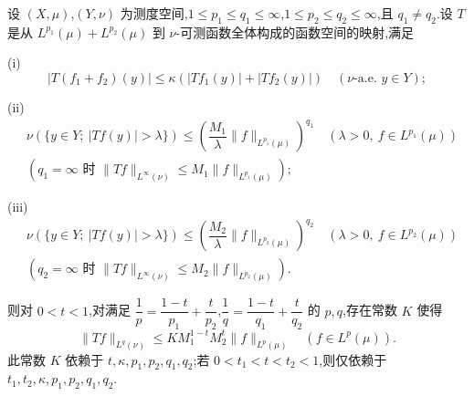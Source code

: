 \begin{theorem}\label{thm:1.8.6}
设 $(X, \mu)$,$(Y, \nu)$ 为测度空间,$1 \leq p_{1} \leq q_{1} \leq \infty$,$1 \leq p_{2} \leq q_{2} \leq \infty$,且 $q_{1} \neq q_{2}$.设 $T$ 是从 $L^{p_{1}}(\mu) + L^{p_{2}}(\mu)$ 到 $\nu$-可测函数全体构成的函数空间的映射,满足

(i)
\begin{equation*}
|T(f_{1} + f_{2})(y)| \leq \kappa\left(|Tf_{1}(y)| + |Tf_{2}(y)|\right) \quad (\nu\text{-a.e. } y \in Y);
\end{equation*}

(ii)
\begin{align*}
& \nu(\{y \in Y;\ |Tf(y)| > \lambda\}) \leq \left(\dfrac{M_{1}}{\lambda}\| f \|_{L^{p_{1}}(\mu)}\right)^{q_{1}} \quad (\lambda > 0,\ f \in L^{p_{1}}(\mu)) \\[4pt]
& \left(q_{1} = \infty \text{ 时 } \| Tf \|_{L^{\infty}(\nu)} \leq M_{1}\| f \|_{L^{p_{1}}(\mu)}\right);
\end{align*}

(iii)
\begin{align*}
& \nu(\{y \in Y;\ |Tf(y)| > \lambda\}) \leq \left(\dfrac{M_{2}}{\lambda}\| f \|_{L^{p_{2}}(\mu)}\right)^{q_{2}} \quad (\lambda > 0,\ f \in L^{p_{2}}(\mu)) \\[4pt]
& \left(q_{2} = \infty \text{ 时 } \| Tf \|_{L^{\infty}(\nu)} \leq M_{2}\| f \|_{L^{p_{2}}(\mu)}\right).
\end{align*}

则对 $0 < t < 1$,对满足 $\dfrac{1}{p} = \dfrac{1 - t}{p_{1}} + \dfrac{t}{p_{2}}$,$\dfrac{1}{q} = \dfrac{1 - t}{q_{1}} + \dfrac{t}{q_{2}}$ 的 $p, q$,存在常数 $K$ 使得
\begin{equation*}
\| Tf \|_{L^{q}(\nu)} \leq KM_{1}^{1-t}M_{2}^{t}\| f \|_{L^{p}(\mu)} \quad (f \in L^{p}(\mu)).
\end{equation*}
此常数 $K$ 依赖于 $t, \kappa, p_{1}, p_{2}, q_{1}, q_{2}$;若 $0 < t_{1} < t < t_{2} < 1$,则仅依赖于 $t_{1}, t_{2}, \kappa, p_{1}, p_{2}, q_{1}, q_{2}$.
\end{theorem}

